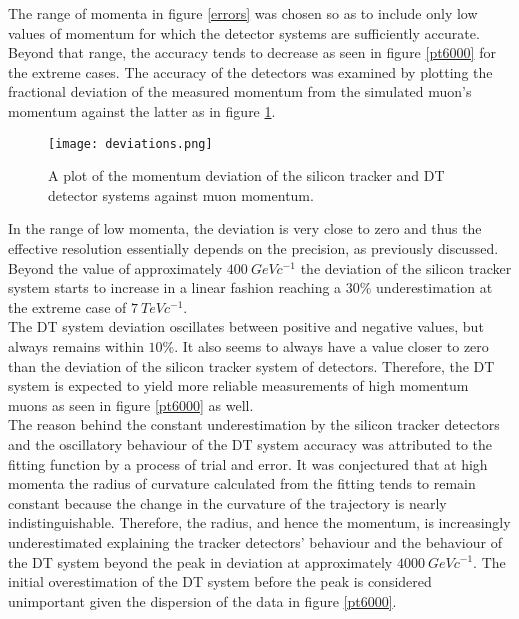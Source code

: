 \documentclass{article}
\begin{document}
The range of momenta in figure \ref{errors} was chosen so as to include only low values of momentum for which the detector systems are sufficiently accurate. Beyond that range, the accuracy tends to decrease as seen in figure \ref{pt6000} for the extreme cases. The accuracy of the detectors was examined by plotting the fractional deviation of the measured momentum from the simulated muon's momentum against the latter as in figure \ref{deviations}.

\pagebreak

\begin{figure}[h]
\centering
\texttt{[image: deviations.png]}
\caption{A plot of the momentum deviation of the silicon tracker and DT detector systems against muon momentum.}
	\label{deviations}
\end{figure}

In the range of low momenta, the deviation is very close to zero and thus the effective resolution essentially depends on the precision, as previously discussed. Beyond the value of approximately $400\ GeVc^{-1}$ the deviation of the silicon tracker system starts to increase in a linear fashion reaching a $30\%$ underestimation at the extreme case of $7\ TeVc^{-1}$.\\

The DT system deviation oscillates between positive and negative values, but always remains within $10\%$. It also seems to always have a value closer to zero than the deviation of the silicon tracker system of detectors. Therefore, the DT system is expected to yield more reliable measurements of high momentum muons as seen in figure \ref{pt6000} as well.\\

The reason behind the constant underestimation by the silicon tracker detectors and the oscillatory behaviour of the DT system accuracy was attributed to the fitting function by a process of trial and error. It was conjectured that at high momenta the radius of curvature calculated from the fitting tends to remain constant because the change in the curvature of the trajectory is nearly indistinguishable. Therefore, the radius, and hence the momentum, is increasingly underestimated explaining the tracker detectors' behaviour and the behaviour of the DT system beyond the peak in deviation at approximately $4000\ GeVc^{-1}$. The initial overestimation of the DT system before the peak is considered unimportant given the dispersion of the data in figure \ref{pt6000}.\\
\end{document}
